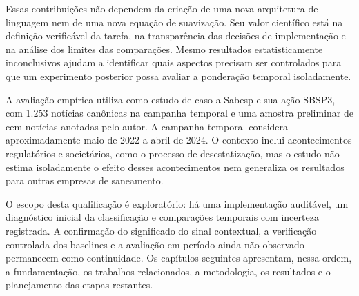 Essas contribuições não dependem da criação de uma nova arquitetura de linguagem nem de uma nova equação de suavização. Seu valor científico está na definição verificável da tarefa, na transparência das decisões de implementação e na análise dos limites das comparações. Mesmo resultados estatisticamente inconclusivos ajudam a identificar quais aspectos precisam ser controlados para que um experimento posterior possa avaliar a ponderação temporal isoladamente.

A avaliação empírica utiliza como estudo de caso a Sabesp e sua ação SBSP3, com 1.253 notícias canônicas na campanha temporal e uma amostra preliminar de cem notícias anotadas pelo autor. A campanha temporal considera aproximadamente maio de 2022 a abril de 2024. O contexto inclui acontecimentos regulatórios e societários, como o processo de desestatização, mas o estudo não estima isoladamente o efeito desses acontecimentos nem generaliza os resultados para outras empresas de saneamento.

O escopo desta qualificação é exploratório: há uma implementação auditável, um diagnóstico inicial da classificação e comparações temporais com incerteza registrada. A confirmação do significado do sinal contextual, a verificação controlada dos baselines e a avaliação em período ainda não observado permanecem como continuidade. Os capítulos seguintes apresentam, nessa ordem, a fundamentação, os trabalhos relacionados, a metodologia, os resultados e o planejamento das etapas restantes.

